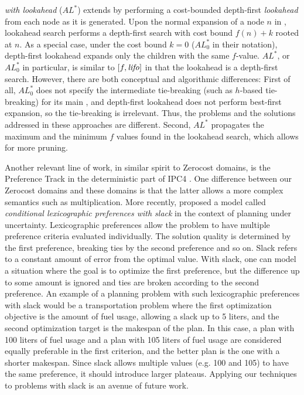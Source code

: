 \emph{\astar with lookahead} ($AL^*$) \cite{stern2010look} extends \astar by performing a cost-bounded depth-first \emph{lookahead} from each node as it is generated. Upon the normal expansion of a node $n$ in \astar, lookahead search performs a depth-first search with cost bound $f(n)+k$ rooted at $n$. As a special case, under the cost bound $k=0$ ($AL^*_0$ in their notation), depth-first lookahead expands only the children with the same $f$-value.
$AL^*$, or $AL^*_0$ in particular, is similar to $[f,{\text{\textit{lifo}}}]$ in that the lookahead is a depth-first search.
However, there are both conceptual and algorithmic differences: 
First of all, $AL^*_0$ does not specify the intermediate tie-breaking (such as $h$-based tie-breaking) for its main \astar, and depth-first lookahead does not perform best-first expansion, so the tie-breaking is irrelevant. Thus, the problems and the solutions addressed in these approaches are different.
Second, $AL^*$ propagates the maximum and the minimum $f$ values found in the lookahead search, which allows for more pruning.

Another relevant line of work, in similar spirit to Zerocost domains, is the Preference Track in the deterministic
part of IPC4 \cite{gerevini2009automatically}. One difference between our Zerocost domains and these domains is
that the latter allows a more complex semantics such as multiplication.
% 
More recently,  \citeyear{wray2015multi} proposed a model called \emph{conditional lexicographic preferences with slack} in the context of planning under uncertainty. 
% 
Lexicographic preferences allow the problem to have multiple preference criteria evaluated individually. The
solution quality is determined by the first preference, breaking ties by the second preference and so on.
% 
Slack refers to a constant amount of error from the optimal value. With slack, one can model a situation where the
goal is to optimize the first preference, but the difference up to some amount is ignored and ties are broken according to 
the second preference.
% 
An example of a planning problem with such lexicographic preferences with slack would be a transportation problem where 
the first optimization objective is the amount of fuel usage, allowing a slack up to 5 liters, and 
the second optimization target is the makespan of the plan.
In this case, a plan with 100 liters of fuel usage and a plan with 105 liters of fuel usage are considered equally preferable in the first criterion, and the better plan is the one with a shorter makespan.
% 
Since slack allows multiple values (e.g. 100 and 105) to have the same preference, it should introduce larger plateaus.
Applying our techniques to problems with slack is an avenue of future work.
